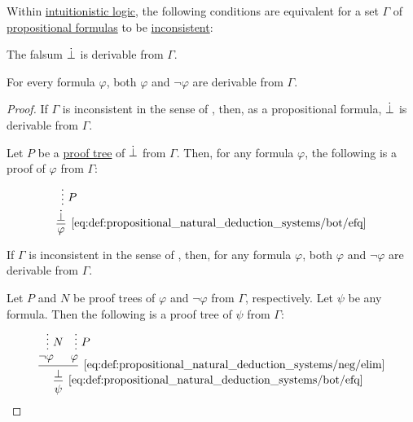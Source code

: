 \begin{proposition}\label{thm:propositional_consistent_set}
  Within \hyperref[def:intuitionistic_logic]{intuitionistic logic}, the following conditions are equivalent for a set \( \Gamma \) of \hyperref[def:propositional_syntax/formula]{propositional formulas} to be \hyperref[def:consistent_set_of_sentences]{inconsistent}:
  \begin{thmenum}
     The falsum \( \dot\bot \) is derivable from \( \Gamma \).

     For every formula \( \varphi \), both \( \varphi \) and \( \neg \varphi \) are derivable from \( \Gamma \).
  \end{thmenum}
\end{proposition}
\begin{proof}

  \SufficiencySubProof* If \( \Gamma \) is inconsistent in the sense of , then, as a propositional formula, \( \dot\bot \) is derivable from \( \Gamma \).

  \NecessitySubProof* Let \( P \) be a \hyperref[def:natural_deduction_proof_tree]{proof tree} of \( \dot\bot \) from \( \Gamma \). Then, for any formula \( \varphi \), the following is a proof of \( \varphi \) from \( \Gamma \):
  \begin{equation*}
    \begin{prooftree}
      \hypo{}
      \ellipsis { \( P \) } { \synbot }
      \infer1[\eqref{eq:def:propositional_natural_deduction_systems/bot/efq}]{ \varphi }.
    \end{prooftree}
  \end{equation*}


  \SufficiencySubProof* If \( \Gamma \) is inconsistent in the sense of , then, for any formula \( \varphi \), both \( \varphi \) and \( \neg \varphi \) are derivable from \( \Gamma \).

  \NecessitySubProof* Let \( P \) and \( N \) be proof trees of \( \varphi \) and \( \neg \varphi \) from \( \Gamma \), respectively. Let \( \psi \) be any formula. Then the following is a proof tree of \( \psi \) from \( \Gamma \):
  \begin{equation*}
    \begin{prooftree}
      \hypo{}
      \ellipsis { \( N \) } { \neg \varphi }

      \hypo{}
      \ellipsis { \( P \) } { \varphi }

      \infer2[\eqref{eq:def:propositional_natural_deduction_systems/neg/elim}]{ \bot }.

      \infer1[\eqref{eq:def:propositional_natural_deduction_systems/bot/efq}]{ \psi }.
    \end{prooftree}
  \end{equation*}
\end{proof}

